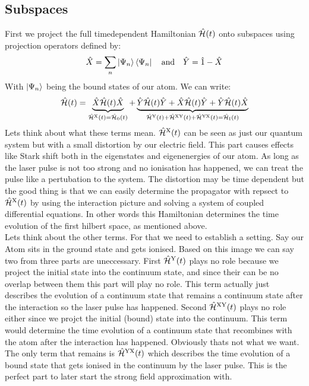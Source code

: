\subsection{Subspaces}
First we project the full timedependent Hamiltonian $\hat{\mathcal{H}}(t)$ onto subspaces using projection operators defined by:
\begin{equation*}
    \hat{X} = \sum_{n}\ket{\Psi_n}\bra{\Psi_n}\quad\text{and}\quad\hat{Y}= \hat{1} - \hat{X}
\end{equation*}
With $\ket{\Psi_n}$ being the bound states of our atom. We can write:
\begin{equation*}
    \hat{\mathcal{H}}(t) = \underbrace{\hat{X}\hat{\mathcal{H}}(t)\hat{X}}_{\hat{\mathcal{H}}^{\mathrm{X}}(t)=\hat{\mathcal{H}}_{\mathrm{0}}(t)} + \underbrace{\hat{Y}\hat{\mathcal{H}}(t)\hat{Y} + \hat{X}\hat{\mathcal{H}}(t)\hat{Y} + \hat{Y}\hat{\mathcal{H}}(t)\hat{X}}_{\hat{\mathcal{H}}^{\mathrm{Y}}(t)+\hat{\mathcal{H}}^{\mathrm{XY}}(t)+\hat{\mathcal{H}}^{\mathrm{YX}}(t)=\hat{\mathcal{H}}_{\mathrm{I}}(t)}
\end{equation*}
Lets think about what these terms mean. $\hat{\mathcal{H}}^{\mathrm{X}}(t)$ can be seen as just our quantum system but with a small distortion by our electric field. 
This part causes effects like Stark shift both in the eigenstates and eigenenergies of our atom. 
As long as the laser pulse is not too strong and no ionisation has happened, we can treat the pulse like a pertubation to the system.
The distortion may be time dependent but the good thing is that we can easily determine the propagator with repsect to $\hat{\mathcal{H}}^{\mathrm{X}}(t)$ by using the interaction picture and solving a system of coupled differential equations.
In other words this Hamiltonian determines the time evolution of the first hilbert space, as mentioned above. \\
Lets think about the other terms. For that we need to establish a setting. Say our Atom sits in the ground state and gets ionised. 
Based on this image we can say two from three parts are uneccessary. First $\hat{\mathcal{H}}^{\mathrm{Y}}(t)$ plays no role because we project the initial state into the continuum state, and since their can be no overlap between them this part will play no role.
This term actually just describes the evolution of a continuum state that remains a continuum state after the interaction so the laser pulse has happened.
Second $\hat{\mathcal{H}}^{\mathrm{XY}}(t)$ plays no role either since we projct the initial (bound) state into the continuum. 
This term would determine the time evolution of a continuum state that recombines with the atom after the interaction has happened.
Obviously thats not what we want. 
The only term that remains is $\hat{\mathcal{H}}^{\mathrm{YX}}(t)$ which describes the time evolution of a bound state that gets ionised in the continuum by the laser pulse.
This is the perfect part to later start the strong field approximation with.\\










